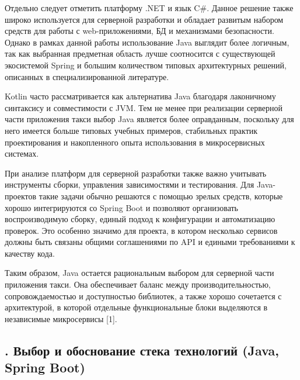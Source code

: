 {  \par \redline Отдельно следует отметить платформу .NET и язык C\#. Данное решение также широко используется для серверной разработки и обладает развитым набором средств для работы с web-приложениями, БД и механизмами безопасности. Однако в рамках данной работы использование Java выглядит более логичным, так как выбранная предметная область лучше соотносится с существующей экосистемой Spring и большим количеством типовых архитектурных решений, описанных в специализированной литературе.

  \par \redline Kotlin часто рассматривается как альтернатива Java благодаря лаконичному синтаксису и совместимости с JVM. Тем не менее при реализации серверной части приложения такси выбор Java является более оправданным, поскольку для него имеется больше типовых учебных примеров, стабильных практик проектирования и накопленного опыта использования в микросервисных системах.

  \par \redline При анализе платформ для серверной разработки также важно учитывать инструменты сборки, управления зависимостями и тестирования. Для Java-проектов такие задачи обычно решаются с помощью зрелых средств, которые хорошо интегрируются со Spring Boot и позволяют организовать воспроизводимую сборку, единый подход к конфигурации и автоматизацию проверок. Это особенно значимо для проекта, в котором несколько сервисов должны быть связаны общими соглашениями по API и едиными требованиями к качеству кода.

  \par \redline Таким образом, Java остается рациональным выбором для серверной части приложения такси. Она обеспечивает баланс между производительностью, сопровождаемостью и доступностью библиотек, а также хорошо сочетается с архитектурой, в которой отдельные функциональные блоки выделяются в независимые микросервисы [1].

}

\subtitlespace

\subsection*{
  \gostTitleFont
  \redline
  \thechaptercntr .\thesubchaptercntr \spc
  Выбор и обоснование стека технологий (Java, Spring Boot)
} \addtocounter{subchaptercntr}{1}

\subtitlespace

